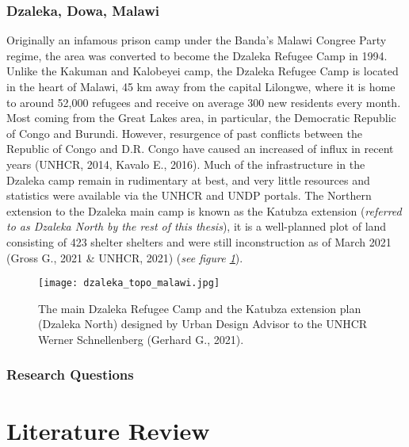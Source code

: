 \documentclass[11pt, a4paper, twoside]{report}
\begin{document}
\subsection{Dzaleka, Dowa, Malawi}\label{Dzaleka}

Originally an infamous prison camp under the Banda's Malawi Congree Party regime, the area was converted to become the Dzaleka Refugee Camp in 1994. Unlike the Kakuman and Kalobeyei camp, the Dzaleka Refugee Camp is located in the heart of Malawi, 45 km away from the capital Lilongwe, where it is home to around 52,000 refugees and receive on average 300 new residents every month. Most coming from the Great Lakes area, in particular, the Democratic Republic of Congo and Burundi. However, resurgence of past conflicts between the Republic of Congo and D.R. Congo have caused an increased of influx in recent years (UNHCR, 2014, Kavalo E., 2016). Much of the infrastructure in the Dzaleka camp remain in rudimentary at best, and very little resources and statistics were available via the UNHCR and UNDP portals. The Northern extension to the Dzaleka main camp is known as the Katubza extension (\textit{referred to as Dzaleka North by the rest of this thesis}), it is a well-planned plot of land consisting of 423 shelter shelters and were still inconstruction as of March 2021 (Gross G., 2021 \& UNHCR, 2021) (\textit{see figure \ref{fig:DZ_KA_PLAN}}).\\\par

\begin{figure}[h]
\centering
\texttt{[image: dzaleka\_topo\_malawi.jpg]}
  \caption{The main Dzaleka Refugee Camp and the Katubza extension plan (Dzaleka North) designed by Urban Design Advisor to the UNHCR Werner Schnellenberg (Gerhard G., 2021).}
\label{fig:DZ_KA_PLAN}
\end{figure}

\subsection{Research Questions}\label{RQ}

\newpage

\chapter{Literature Review}\label{LitReview}
\end{document}
